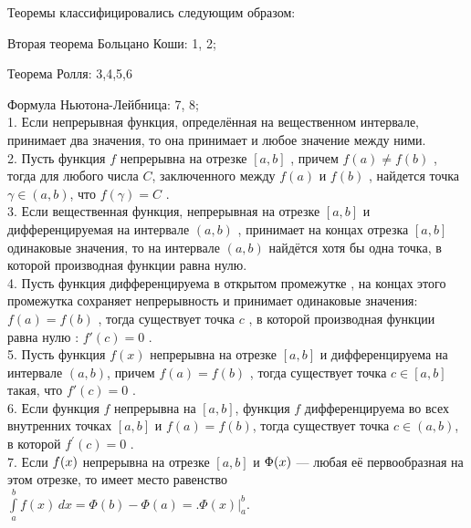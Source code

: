 \documentclass[12pt]{article}
\begin{document}
Теоремы классифицировались следующим образом:

Вторая теорема Больцано Коши: 1, 2;

Теорема Ролля: 3,4,5,6

Формула Ньютона-Лейбница: 7, 8; \\

1. Если непрерывная функция, определённая на вещественном интервале, принимает два значения, то она принимает и любое значение между ними.\\

2. Пусть функция ${\displaystyle f}$ непрерывна на отрезке ${\displaystyle [a,b]}$ , причем ${\displaystyle f(a) \neq f(b)}$ , тогда для любого числа ${\displaystyle C}$, заключенного между ${\displaystyle f(a)}$ и ${\displaystyle f(b)}$ , найдется точка ${\displaystyle \gamma \in (a,b)}$, что ${\displaystyle f(\gamma)=C}$ .\\

3. Если вещественная функция, непрерывная на отрезке ${\displaystyle [a,b]}$ и дифференцируемая на интервале ${\displaystyle (a,b)}$ , принимает на концах отрезка ${\displaystyle [a,b]}$ одинаковые значения, то на интервале ${\displaystyle (a,b)}$ найдётся хотя бы одна точка, в которой производная функции равна нулю. \\
 
4. Пусть функция  дифференцируема в открытом промежутке , на концах этого промежутка сохраняет непрерывность и принимает одинаковые значения: ${\displaystyle f(a)=f(b)}$ , тогда существует точка $c$ , в которой производная функции  равна нулю : ${\displaystyle f'(c)=0}$ .\\

5. Пусть функция ${\displaystyle f(x)}$ непрерывна на отрезке ${\displaystyle [a,b]}$ и дифференцируема на интервале ${\displaystyle (a,b)}$, причем ${\displaystyle f(a)=f(b)}$ , тогда существует точка ${\displaystyle c \in [a, b]}$ такая, что ${\displaystyle f'(c)=0}$ . \\
 
6. Если функция $f$ непрерывна на ${\displaystyle [a,b]}$, функция $f$ дифференцируема во всех внутренних точках ${\displaystyle [a,b]}$ и ${\displaystyle f(a)=f(b)}$, тогда существует точка ${\displaystyle c\in (a,b)}$, в которой ${\displaystyle f^{\prime}(c)=0}$ .\\

7. Если ${\displaystyle \textstyle f(x)}$ непрерывна на отрезке ${\displaystyle \left[a,b\right]}$  и ${\displaystyle \textstyle \Phi (x)}$ — любая её первообразная на этом отрезке, то имеет место равенство ${\displaystyle \int \limits _a^b f(x)\,dx=\Phi (b)-\Phi (a)={\Bigg .}\Phi (x){\Bigg |}_{a}^{b}}$.\\
\end{document}
